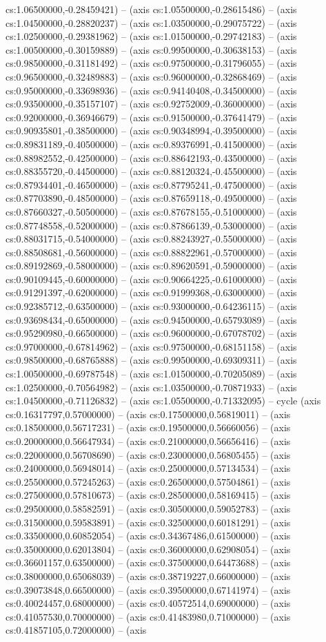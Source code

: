cs:1.06500000,-0.28459421) -- (axis cs:1.05500000,-0.28615486) -- (axis cs:1.04500000,-0.28820237) -- (axis cs:1.03500000,-0.29075722) -- (axis cs:1.02500000,-0.29381962) -- (axis cs:1.01500000,-0.29742183) -- (axis cs:1.00500000,-0.30159889) -- (axis cs:0.99500000,-0.30638153) -- (axis cs:0.98500000,-0.31181492) -- (axis cs:0.97500000,-0.31796055) -- (axis cs:0.96500000,-0.32489883) -- (axis cs:0.96000000,-0.32868469) -- (axis cs:0.95000000,-0.33698936) -- (axis cs:0.94140408,-0.34500000) -- (axis cs:0.93500000,-0.35157107) -- (axis cs:0.92752009,-0.36000000) -- (axis cs:0.92000000,-0.36946679) -- (axis cs:0.91500000,-0.37641479) -- (axis cs:0.90935801,-0.38500000) -- (axis cs:0.90348994,-0.39500000) -- (axis cs:0.89831189,-0.40500000) -- (axis cs:0.89376991,-0.41500000) -- (axis cs:0.88982552,-0.42500000) -- (axis cs:0.88642193,-0.43500000) -- (axis cs:0.88355720,-0.44500000) -- (axis cs:0.88120324,-0.45500000) -- (axis cs:0.87934401,-0.46500000) -- (axis cs:0.87795241,-0.47500000) -- (axis cs:0.87703890,-0.48500000) -- (axis cs:0.87659118,-0.49500000) -- (axis cs:0.87660327,-0.50500000) -- (axis cs:0.87678155,-0.51000000) -- (axis cs:0.87748558,-0.52000000) -- (axis cs:0.87866139,-0.53000000) -- (axis cs:0.88031715,-0.54000000) -- (axis cs:0.88243927,-0.55000000) -- (axis cs:0.88508681,-0.56000000) -- (axis cs:0.88822961,-0.57000000) -- (axis cs:0.89192869,-0.58000000) -- (axis cs:0.89620591,-0.59000000) -- (axis cs:0.90109445,-0.60000000) -- (axis cs:0.90664225,-0.61000000) -- (axis cs:0.91291397,-0.62000000) -- (axis cs:0.91999368,-0.63000000) -- (axis cs:0.92385712,-0.63500000) -- (axis cs:0.93000000,-0.64236115) -- (axis cs:0.93698434,-0.65000000) -- (axis cs:0.94500000,-0.65793089) -- (axis cs:0.95290980,-0.66500000) -- (axis cs:0.96000000,-0.67078702) -- (axis cs:0.97000000,-0.67814962) -- (axis cs:0.97500000,-0.68151158) -- (axis cs:0.98500000,-0.68765888) -- (axis cs:0.99500000,-0.69309311) -- (axis cs:1.00500000,-0.69787548) -- (axis cs:1.01500000,-0.70205089) -- (axis cs:1.02500000,-0.70564982) -- (axis cs:1.03500000,-0.70871933) -- (axis cs:1.04500000,-0.71126832) -- (axis cs:1.05500000,-0.71332095) -- cycle (axis cs:0.16317797,0.57000000) -- (axis cs:0.17500000,0.56819011) -- (axis cs:0.18500000,0.56717231) -- (axis cs:0.19500000,0.56660056) -- (axis cs:0.20000000,0.56647934) -- (axis cs:0.21000000,0.56656416) -- (axis cs:0.22000000,0.56708690) -- (axis cs:0.23000000,0.56805455) -- (axis cs:0.24000000,0.56948014) -- (axis cs:0.25000000,0.57134534) -- (axis cs:0.25500000,0.57245263) -- (axis cs:0.26500000,0.57504861) -- (axis cs:0.27500000,0.57810673) -- (axis cs:0.28500000,0.58169415) -- (axis cs:0.29500000,0.58582591) -- (axis cs:0.30500000,0.59052783) -- (axis cs:0.31500000,0.59583891) -- (axis cs:0.32500000,0.60181291) -- (axis cs:0.33500000,0.60852054) -- (axis cs:0.34367486,0.61500000) -- (axis cs:0.35000000,0.62013804) -- (axis cs:0.36000000,0.62908054) -- (axis cs:0.36601157,0.63500000) -- (axis cs:0.37500000,0.64473688) -- (axis cs:0.38000000,0.65068039) -- (axis cs:0.38719227,0.66000000) -- (axis cs:0.39073848,0.66500000) -- (axis cs:0.39500000,0.67141974) -- (axis cs:0.40024457,0.68000000) -- (axis cs:0.40572514,0.69000000) -- (axis cs:0.41057530,0.70000000) -- (axis cs:0.41483980,0.71000000) -- (axis cs:0.41857105,0.72000000) -- (axis 
